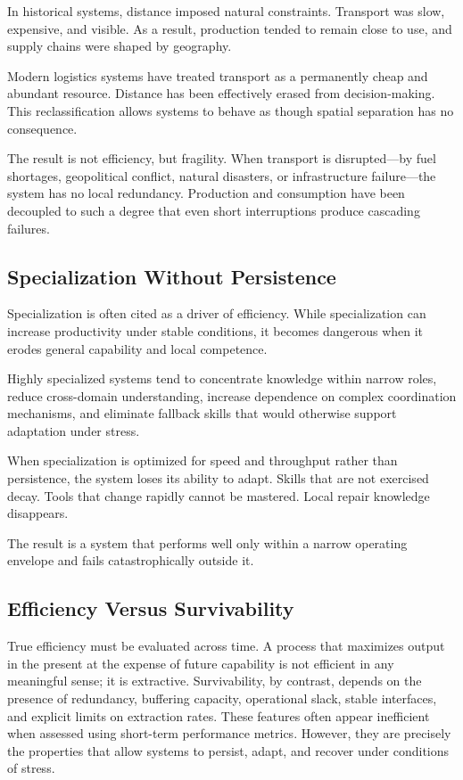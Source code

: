 \documentclass[12pt]{article} \usepackage[margin=1in]{geometry} \usepackage{setspace} \usepackage{amsmath,amssymb} \usepackage{hyperref}
\begin{document}
In historical systems, distance imposed natural constraints. Transport was slow, expensive, and visible. As a result, production tended to remain close to use, and supply chains were shaped by geography.

Modern logistics systems have treated transport as a permanently cheap and abundant resource. Distance has been effectively erased from decision-making. This reclassification allows systems to behave as though spatial separation has no consequence.

The result is not efficiency, but fragility. When transport is disrupted—by fuel shortages, geopolitical conflict, natural disasters, or infrastructure failure—the system has no local redundancy. Production and consumption have been decoupled to such a degree that even short interruptions produce cascading failures.

\subsection{Specialization Without Persistence}

Specialization is often cited as a driver of efficiency. While specialization can increase productivity under stable conditions, it becomes dangerous when it erodes general capability and local competence.

Highly specialized systems tend to concentrate knowledge within narrow roles, reduce cross-domain understanding, increase dependence on complex coordination mechanisms, and eliminate fallback skills that would otherwise support adaptation under stress.

When specialization is optimized for speed and throughput rather than persistence, the system loses its ability to adapt. Skills that are not exercised decay. Tools that change rapidly cannot be mastered. Local repair knowledge disappears.

The result is a system that performs well only within a narrow operating envelope and fails catastrophically outside it.

\subsection{Efficiency Versus Survivability}

True efficiency must be evaluated across time. A process that maximizes output in the present at the expense of future capability is not efficient in any meaningful sense; it is extractive. Survivability, by contrast, depends on the presence of redundancy, buffering capacity, operational slack, stable interfaces, and explicit limits on extraction rates. These features often appear inefficient when assessed using short-term performance metrics. However, they are precisely the properties that allow systems to persist, adapt, and recover under conditions of stress.
\end{document}

